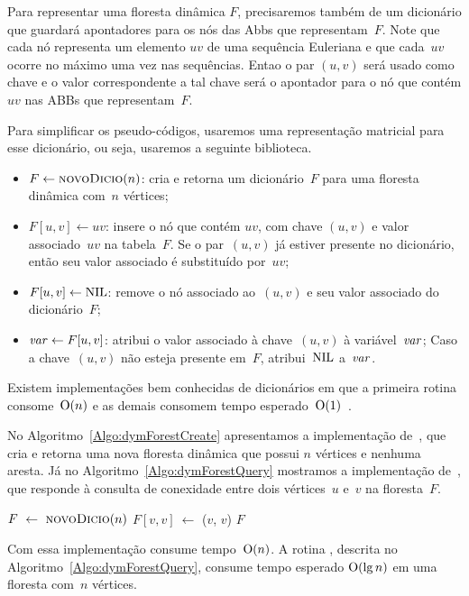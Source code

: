 Para representar uma floresta dinâmica $F$, precisaremos também de um dicionário que guardará apontadores para os nós das Abbs que representam~$F$. Note que cada nó representa um elemento $uv$ de uma sequência Euleriana e que cada~$uv$ ocorre no máximo uma vez nas sequências. Entao o par $(u,v)$ será usado como chave e o valor correspondente a tal chave será o apontador para o nó que contém $uv$ nas ABBs que representam~$F$.

Para simplificar os pseudo-códigos, usaremos uma representação matricial para esse dicionário, ou seja, usaremos a seguinte biblioteca.
\begin{itemize}
    \item $F \gets \text{\scshape novoDicio}(n)$: cria e retorna um dicionário~$F$ para uma floresta dinâmica com~$n$ vértices;
    \item $F[u,v] \gets uv$: insere o nó que contém $uv$, com chave $(u,v)$ e valor associado~$uv$ na tabela~$F$.
    Se o par~$(u,v)$ já estiver presente no dicionário, então seu valor associado é substituído por~$uv$;
    \item $F[u,v] \gets \text{NIL}{}$: remove o nó associado ao~$(u,v)$ e seu valor associado do dicionário~$F$;
    \item $\mathit{var} \gets F[u,v]$: atribui o valor associado à chave~$(u,v)$ à variável~$\mathit{var}$; Caso a chave~$(u,v)$ não esteja presente em~$F$, atribui~$\text{NIL}$ a~$\mathit{var}$.
\end{itemize}
Existem implementações bem conhecidas de dicionários em que a primeira rotina consome~$\mathrm{O}(n)$ e as demais consomem tempo esperado~$\mathrm{O}(1)$~\cite{CLRS}.

No Algoritmo~\ref{Algo:dymForestCreate} apresentamos a implementação de~\dymForestCreate{}, que cria e retorna uma nova floresta dinâmica que possui $n$ vértices e nenhuma aresta.
Já no Algoritmo~\ref{Algo:dymForestQuery} mostramos a implementação de~\dymForestQuery{}, que responde à consulta de conexidade entre dois vértices~$u$ e~$v$ na floresta~$F$.


\begin{algorithm}[htb]
\caption{\dymForestCreate($n$)}
\label{Algo:dymForestCreate}
\begin{algorithmic}[1]
\State $F~\gets~\text{\scshape novoDicio}(n)$
\label{Algo:dymForestCreate:for}
\State $F[v,v]~\gets$ \treapCreate($v$, $v$)
\EndFor
\State \Return $F$
\end{algorithmic}
\end{algorithm}

Com essa implementação \dymForestCreate{} consume tempo~$\mathrm{O}(n)$. A rotina \dymForestQuery{}, descrita no Algoritmo~\ref{Algo:dymForestQuery}, consume tempo esperado $\mathrm{O}(\lg n)$ em uma floresta com~$n$ vértices.


